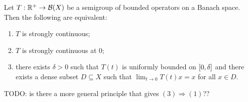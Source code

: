 \begin{proposition} \label{equivalentContinuityConditionsC0Semigroup}
Let $T:\mathbb{R}^+\to \operatorname{\mathcal{B}}(X)$ be a semigroup of bounded operators on a Banach space. Then the following are equivalent:
\begin{enumerate}
\item $T$ is strongly continuous;
\item $T$ is strongly continuous at $0$;
\item there exists $\delta > 0$ such that $T(t)$ is uniformly bounded on $\interval{0,\delta}$ and there exists a dense subset $D\subseteq X$ such that $\lim_{t\to 0} T(t)x = x$ for all $x\in D$.
\end{enumerate}
\end{proposition}
TODO: is there a more general principle that gives $(3) \Rightarrow (1)$??
